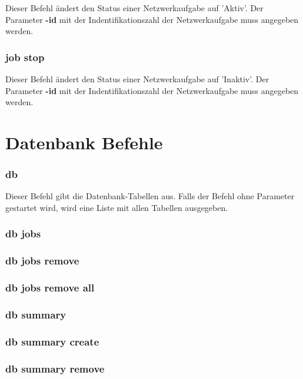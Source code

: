 \documentclass[12pt,a4paper]{report}
\begin{document}
Dieser Befehl ändert den Status einer Netzwerkaufgabe auf 'Aktiv'. Der Parameter \textbf{-id} mit der Indentifikationszahl der Netzwerkaufgabe muss angegeben werden.

\subsubsection{job stop}

Dieser Befehl ändert den Status einer Netzwerkaufgabe auf 'Inaktiv'. Der Parameter \textbf{-id} mit der Indentifikationszahl der Netzwerkaufgabe muss angegeben werden.

\section{Datenbank Befehle}

\subsubsection{db}

Dieser Befehl gibt die Datenbank-Tabellen aus. Falls der Befehl ohne Parameter gestartet wird, wird eine Liste mit allen Tabellen ausgegeben.

\subsubsection{db jobs}

\subsubsection{db jobs remove}

\subsubsection{db jobs remove all}

\subsubsection{db summary}

\subsubsection{db summary create}

\subsubsection{db summary remove}
\end{document}
